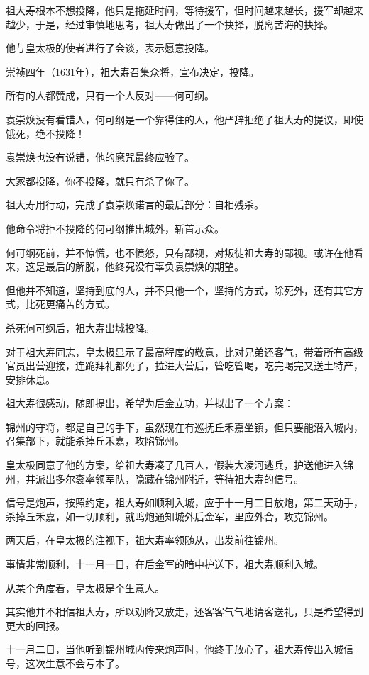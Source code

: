 \begin{multicols}{\theparacolNo}
祖大寿根本不想投降，他只是拖延时间，等待援军，但时间越来越长，援军却越来越少，于是，经过审慎地思考，祖大寿做出了一个抉择，脱离苦海的抉择。

他与皇太极的使者进行了会谈，表示愿意投降。

崇祯四年（1631年），祖大寿召集众将，宣布决定，投降。

所有的人都赞成，只有一个人反对——何可纲。

袁崇焕没有看错人，何可纲是一个靠得住的人，他严辞拒绝了祖大寿的提议，即使饿死，绝不投降！

袁崇焕也没有说错，他的魔咒最终应验了。

大家都投降，你不投降，就只有杀了你了。

祖大寿用行动，完成了袁崇焕诺言的最后部分：自相残杀。

他命令将拒不投降的何可纲推出城外，斩首示众。

何可纲死前，并不惊慌，也不愤怒，只有鄙视，对叛徒祖大寿的鄙视。或许在他看来，这是最后的解脱，他终究没有辜负袁崇焕的期望。

但他并不知道，坚持到底的人，并不只他一个，坚持的方式，除死外，还有其它方式，比死更痛苦的方式。

杀死何可纲后，祖大寿出城投降。

对于祖大寿同志，皇太极显示了最高程度的敬意，比对兄弟还客气，带着所有高级官员出营迎接，连跪拜礼都免了，拉进大营后，管吃管喝，吃完喝完又送土特产，安排休息。

祖大寿很感动，随即提出，希望为后金立功，并拟出了一个方案：

锦州的守将，都是自己的手下，虽然现在有巡抚丘禾嘉坐镇，但只要能潜入城内，召集部下，就能杀掉丘禾嘉，攻陷锦州。

皇太极同意了他的方案，给祖大寿凑了几百人，假装大凌河逃兵，护送他进入锦州，并派出多尔衮率领军队，隐藏在锦州附近，等待祖大寿的信号。

信号是炮声，按照约定，祖大寿如顺利入城，应于十一月二日放炮，第二天动手，杀掉丘禾嘉，如一切顺利，就鸣炮通知城外后金军，里应外合，攻克锦州。

两天后，在皇太极的注视下，祖大寿率领随从，出发前往锦州。

事情非常顺利，十一月一日，在后金军的暗中护送下，祖大寿顺利入城。

从某个角度看，皇太极是个生意人。

其实他并不相信祖大寿，所以劝降又放走，还客客气气地请客送礼，只是希望得到更大的回报。

十一月二日，当他听到锦州城内传来炮声时，他终于放心了，祖大寿传出入城信号，这次生意不会亏本了。


\end{multicols}
